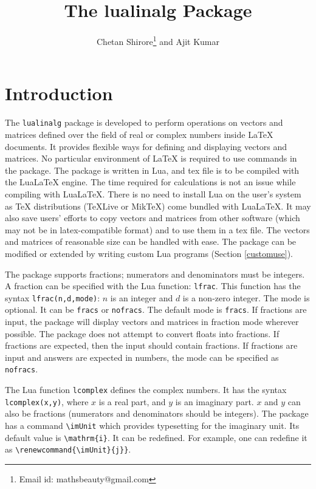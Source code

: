 \documentclass{article}
\begin{document}
\title{The lualinalg Package}
\author{Chetan Shirore\thanks{Email id: mathsbeauty@gmail.com} \space and  Ajit Kumar}
\maketitle

\section{Introduction}

The \verb|lualinalg| package is developed to perform operations on vectors and matrices defined over the field of real or complex numbers inside LaTeX documents. It provides flexible ways for defining and displaying vectors and matrices. No particular environment of LaTeX is required to use commands in the package. The package is written in Lua, and tex file is to be compiled with the LuaLaTeX engine. The time required for calculations is not an issue while compiling with LuaLaTeX. There is no need to install Lua on the user's system as TeX distributions (TeXLive or MikTeX) come bundled with LuaLaTeX. It may also save users' efforts to copy vectors and matrices from other software (which may not be in latex-compatible format) and to use them in a tex file. The vectors and matrices of reasonable size can be handled with ease. The package can be modified or extended by writing custom Lua programs (Section \ref{customuse}).

The package supports fractions; numerators and denominators must be integers. A fraction can be specified with the Lua function: \verb|lfrac|. This function has the syntax \verb|lfrac(n,d,mode)|: \(n\) is an integer and \(d\) is a non-zero integer. The mode is optional. It can be \verb|fracs| or \verb|nofracs|. The default mode is \verb|fracs|. If fractions are input, the package will display vectors and matrices in fraction mode wherever possible. The package does not attempt to convert floats into fractions. If fractions are expected, then the input should contain fractions. If fractions are input and  answers are expected in numbers,  the mode can be specified as \verb|nofracs|. 

The Lua function \verb|lcomplex| defines the complex numbers. It has the syntax \verb|lcomplex(x,y)|, where \(x\) is a real part, and  \(y\) is an imaginary part. \(x\) and \(y\) can also be fractions (numerators and denominators should be integers). The package has a command \verb|\imUnit| which provides typesetting for the imaginary unit. Its default value is \verb|\mathrm{i}|. It can be redefined. For example, one can redefine it as \verb|\renewcommand{\imUnit}{j}}|.
\end{document}
